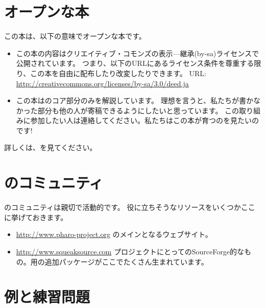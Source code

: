 \documentclass[a4paper,10pt,twoside]{book}
\begin{document}
\section*{オープンな本}

この本は、以下の意味でオープンな本です。

\begin{itemize}


\item	この本の内容はクリエイティブ・コモンズの表示—継承(by-sa)ライセンスで公開されています。
		つまり、以下のURLにあるライセンス条件を尊重する限り、この本を自由に配布したり改変したりできます。
		URL: 
		\url{http://creativecommons.org/licenses/by-sa/3.0/deed.ja}

\item	この本は\pharo のコア部分のみを解説しています。
		理想を言うと、私たちが書かなかった部分も他の人が寄稿できるようにしたいと思っています。
		この取り組みに参加したい人は連絡してください。私たちはこの本が育つのを見たいのです!
		
\end{itemize}


詳しくは、\pbe を見てください。


\section*{ \pharo のコミュニティ}


\pharo のコミュニティは親切で活動的です。
役に立ちそうなリソースをいくつかここに挙げておきます。

\begin{itemize}
\item \url{http://www.pharo-project.org} \pharo のメインとなるウェブサイト。


\item \url{http://www.squeaksource.com} \pharo プロジェクトにとってのSourceForge的なもの。\pharo 用の追加パッケージがここでたくさん生まれています。

\end{itemize}

\section*{例と練習問題}
\end{document}
